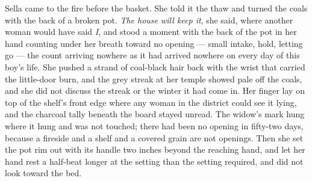 Sella came to the fire before the basket. She told it the thaw and turned the coals with the back of a broken pot. \emph{The house will keep it}, she said, where another woman would have said \emph{I}, and stood a moment with the back of the pot in her hand counting under her breath toward no opening --- small intake, hold, letting go --- the count arriving nowhere as it had arrived nowhere on every day of this boy's life. She pushed a strand of coal-black hair back with the wrist that carried the little-door burn, and the grey streak at her temple showed pale off the coals, and she did not discuss the streak or the winter it had come in. Her finger lay on top of the shelf's front edge where any woman in the district could see it lying, and the charcoal tally beneath the board stayed unread. The widow's mark hung where it hung and was not touched; there had been no opening in fifty-two days, because a fireside and a shelf and a covered grain are not openings. Then she set the pot rim out with its handle two inches beyond the reaching hand, and let her hand rest a half-beat longer at the setting than the setting required, and did not look toward the bed.
